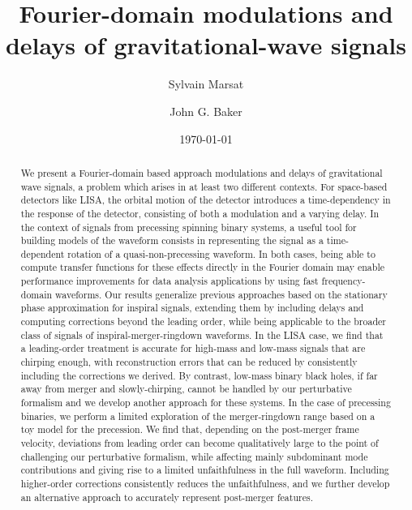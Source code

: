 \documentclass[aps,showpacs,twocolumn,
prd,superscriptaddress,nofootinbib]{revtex4-1}
\newcommand{\jgb}[1]{{\color{DarkGreen} #1}}
\begin{document}
\title{Fourier-domain modulations and delays of gravitational-wave signals}

\author{Sylvain Marsat}
\author{John G. Baker}

\date{\today}

\begin{abstract}

We present a Fourier-domain based approach modulations and delays of gravitational wave signals, a problem which arises in \jgb{at least} two different contexts. For space-based detectors like LISA, the orbital motion of the detector introduces a time-dependency in the response of the detector, consisting of both a modulation and a varying delay. In the context of signals from precessing spinning binary systems, a useful tool for building models of the waveform consists in representing the signal as a time-dependent rotation of a quasi-non-precessing waveform. In both cases, being able to compute transfer functions for these effects directly in the Fourier domain may enable performance improvements for data analysis applications by using fast frequency-domain waveforms. Our results generalize previous approaches based on the stationary phase approximation for inspiral signals, extending them by including delays and computing corrections beyond the leading order, while being applicable to the broader class of signals of inspiral-merger-ringdown waveforms. In the LISA case, we find that a leading-order treatment is accurate for high-mass and low-mass signals that are chirping enough, with reconstruction errors that can be reduced by consistently including the corrections we derived. By contrast, low-mass binary black holes, if far away from merger and slowly-chirping, cannot be handled by our perturbative formalism and we develop another approach for these systems. In the case of precessing binaries, we perform a limited exploration of the merger-ringdown range based on a toy model for the precession. We find that, depending on the post-merger frame velocity, deviations from leading order can become qualitatively large to the point of challenging our perturbative formalism, while affecting mainly subdominant mode contributions and giving rise to a limited unfaithfulness in the full waveform. Including higher-order corrections consistently reduces the unfaithfulness, and we further develop an alternative approach to accurately represent post-merger features.

\end{abstract}
\end{document}
